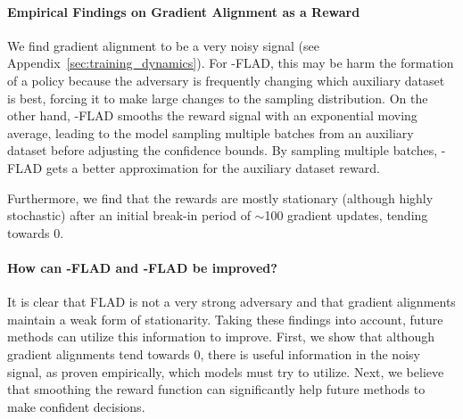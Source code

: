 \paragraph{Empirical Findings on Gradient Alignment as a Reward}
We find gradient alignment to be a very noisy signal (see Appendix~\ref{sec:training_dynamics}). For \ex{}-FLAD, this may be harm the formation of a policy because the adversary is frequently changing which auxiliary dataset is best, forcing it to make large changes to the sampling distribution. On the other hand, \ucb{}-FLAD smooths the reward signal with an exponential moving average, leading to the model sampling multiple batches from an auxiliary dataset before adjusting the confidence bounds. By sampling multiple batches, \ucb{}-FLAD gets a better approximation for the auxiliary dataset reward.

Furthermore, we find that the rewards are mostly stationary (although highly stochastic) after an initial break-in period of $\sim$100 gradient updates, tending towards 0.

\paragraph{How can \ex{}-FLAD and \ucb{}-FLAD be improved?}
It is clear that FLAD is not a very strong adversary and that gradient alignments maintain a weak form of stationarity. Taking these findings into account, future methods can utilize this information to improve. First, we show that although gradient alignments tend towards 0, there is useful information in the noisy signal, as proven empirically, which models must try to utilize. Next, we believe that smoothing the reward function can significantly help future methods to make confident decisions.  %






